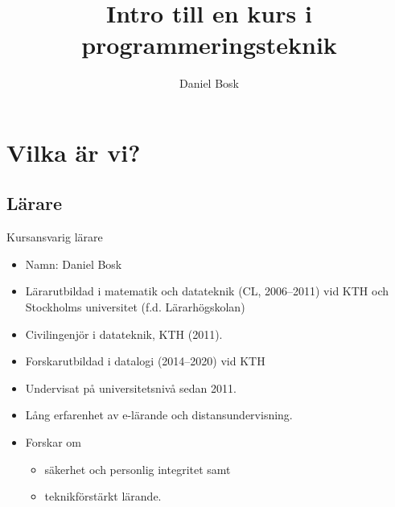 \title{%
  Intro till en kurs i programmeringsteknik
}
\author{Daniel Bosk}


\mode*

\begin{abstract}
  
\end{abstract}


\section{Vilka är vi?}

\subsection{Lärare}

\begin{frame}
  \begin{block}{Kursansvarig lärare}
    \begin{itemize}
      \item Namn: Daniel Bosk
      \item Lärarutbildad i matematik och datateknik (CL, 2006--2011) vid KTH 
        och Stockholms universitet (f.d. Lärarhögskolan)
      \item Civilingenjör i datateknik, KTH (2011).
      \item Forskarutbildad i datalogi (2014--2020) vid KTH

        \pause

      \item Undervisat på universitetsnivå sedan 2011.
      \item Lång erfarenhet av e-lärande och distansundervisning.

        \pause

      \item Forskar om
        \begin{itemize}
          \item säkerhet och personlig integritet samt
          \item teknikförstärkt lärande.
        \end{itemize}
    \end{itemize}
  \end{block}
\end{frame}

